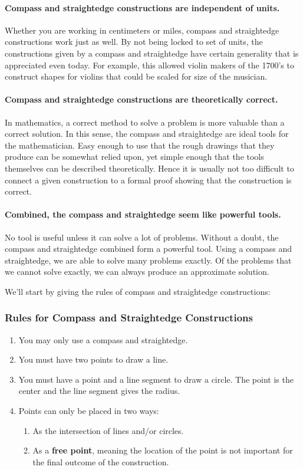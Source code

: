 \documentclass{ximera}
\begin{document}
\paragraph{Compass and straightedge constructions are \textbf{independent of units}.} 
Whether you are working in centimeters or miles, compass and
straightedge constructions work just as well. By not being locked to
set of units, the constructions given by a compass and straightedge
have certain generality that is appreciated even today. For example,
this allowed violin makers of the 1700's to construct shapes for
violins that could be scaled for size of the musician.


\paragraph{Compass and straightedge constructions are \textbf{theoretically correct}.} 
In mathematics, a correct method to solve a problem is more valuable
than a correct solution. In this sense, the compass and straightedge
are ideal tools for the mathematician. Easy enough to use that the
rough drawings that they produce can be somewhat relied upon, yet
simple enough that the tools themselves can be described
theoretically. Hence it is usually not too difficult to connect a
given construction to a formal proof showing that the construction is
correct.


\paragraph{Combined, the compass and straightedge seem like \textbf{powerful tools}.} 
No tool is useful unless it can solve a lot of problems. Without a
doubt, the compass and straightedge combined form a powerful
tool. Using a compass and straightedge, we are able to solve many
problems exactly. Of the problems that we cannot solve exactly, we can
always produce an approximate solution.


We'll start by giving the rules of compass and straightedge
constructions:

\subsubsection{Rules for Compass and Straightedge Constructions}
\begin{enumerate}
\item You may only use a compass and straightedge.
\item You must have two points to draw a line.
\item You must have a point and a line segment to draw a circle. The
  point is the center and the line segment gives the radius.
\item Points can only be placed in two ways:
\begin{enumerate}
\item As the intersection of lines and/or circles.
\item As a \textbf{free point}, meaning the location
  of the point is not important for the final outcome of the
  construction.
\end{enumerate}
\end{enumerate}
\end{document}
